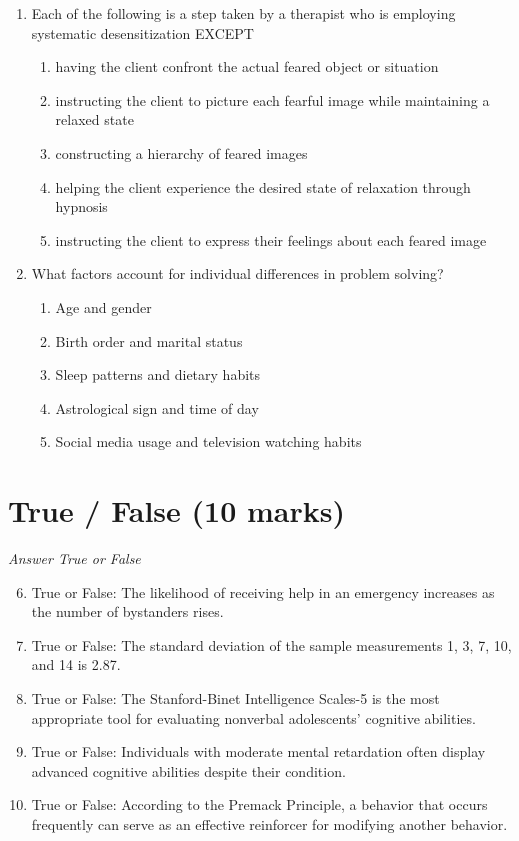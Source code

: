\documentclass[12pt]{article}
\begin{document}
\begin{enumerate}[label=\arabic*.]
\begin{enumerate}[label=(\alph*)]
\end{enumerate}
\item Each of the following is a step taken by a therapist who is employing systematic desensitization EXCEPT
\begin{enumerate}[label=(\alph*)]
    \item having the client confront the actual feared object or situation
    \item instructing the client to picture each fearful image while maintaining a relaxed state
    \item constructing a hierarchy of feared images
    \item helping the client experience the desired state of relaxation through hypnosis
    \item instructing the client to express their feelings about each feared image
\end{enumerate}
\item What factors account for individual differences in problem solving?
\begin{enumerate}[label=(\alph*)]
    \item Age and gender
    \item Birth order and marital status
    \item Sleep patterns and dietary habits
    \item Astrological sign and time of day
    \item Social media usage and television watching habits
\end{enumerate}
\end{enumerate}

\section*{True / False (10 marks)}
\textit{Answer True or False}
\begin{enumerate}[label=\arabic*.]
\setcounter{enumi}{5}
\item True or False: The likelihood of receiving help in an emergency increases as the number of bystanders rises.
\item True or False: The standard deviation of the sample measurements 1, 3, 7, 10, and 14 is 2.87.
\item True or False: The Stanford-Binet Intelligence Scales-5 is the most appropriate tool for evaluating nonverbal adolescents' cognitive abilities.
\item True or False: Individuals with moderate mental retardation often display advanced cognitive abilities despite their condition.
\item True or False: According to the Premack Principle, a behavior that occurs frequently can serve as an effective reinforcer for modifying another behavior.
\end{enumerate}
\end{document}
